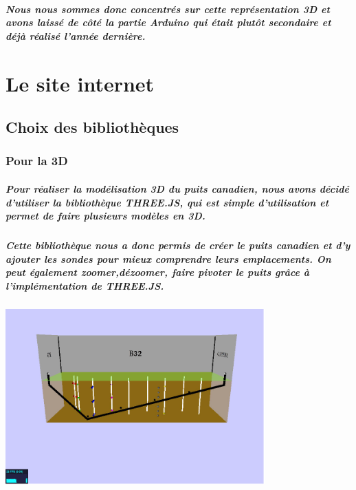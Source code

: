 \documentclass[12pt , a4paper,titlepage]{report}
\begin{document}
 \paragraph{   Nous nous sommes donc concentrés sur cette représentation 3D et avons laissé de côté la partie Arduino qui était plutôt
 secondaire et déjà réalisé l'année dernière.}



 \chapter {Le site internet}
 \section{Choix des bibliothèques}
 \subsection{Pour la 3D}
 \paragraph{Pour réaliser la modélisation 3D du puits canadien, nous avons décidé d'utiliser la bibliothèque THREE.JS, qui est simple
 d'utilisation et permet de faire plusieurs modèles en 3D.}
 \paragraph{ Cette bibliothèque nous a donc permis de créer le puits canadien et d'y ajouter les sondes pour mieux comprendre leurs 
 emplacements. On peut également zoomer,dézoomer, faire pivoter le puits grâce à l'implémentation de THREE.JS. }
 \begin{center}\includegraphics[width=10cm]{puit.jpg}\end{center}
\end{document}

